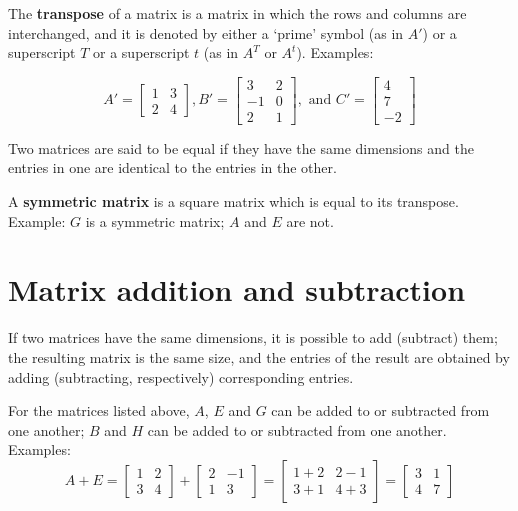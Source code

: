 \documentclass[12pt]{article}
\begin{document}
The {\bf transpose} of a matrix is a matrix in which the rows and columns
are interchanged, and it is denoted by either a `prime' symbol (as in $A'$) or
a superscript $T$ or a superscript $t$ (as in $A^T$ or $A^t$).  Examples:

$$ A' =  \left[ \begin{array}{cc}  1 & 3 \\ 2 & 4  \end{array} \right],
 B' =  \left[ \begin{array}{cc}  3 & 2 \\ -1 & 0 \\ 2 & 1  \end{array} \right],
 {\mbox{ and }}
C' =  \left[ \begin{array}{c}  4 \\ 7 \\ -2   \end{array} \right]$$

Two matrices are said to be equal if they have the same dimensions and the entries
in one are identical to the entries in the other.

A {\bf symmetric matrix} is a square matrix which is equal to its transpose.
Example: $G$ is a symmetric matrix; $A$ and $E$ are not.


\section{Matrix addition and subtraction}

If two matrices have the same dimensions, it is possible to
add (subtract) them; the resulting matrix is the same size, and the entries of the
result are obtained by adding (subtracting, respectively) corresponding
entries.

For the matrices listed above, $A$, $E$ and $G$ can be added to
or subtracted from one another; $B$ and $H$ can be added to or subtracted from
one another.  Examples:
$$ A + E = 
    \left[ \begin{array}{cc}  1 & 2 \\ 3 & 4  \end{array} \right]
 +  \left[ \begin{array}{cc}  2 & -1 \\ 1 & 3 \end{array} \right]
 =  \left[ \begin{array}{cc}  1+2 & 2-1 \\ 3+1 & 4+3 \end{array} \right]
 =  \left[ \begin{array}{cc}  3 & 1 \\ 4 & 7 \end{array} \right]$$
\end{document}
